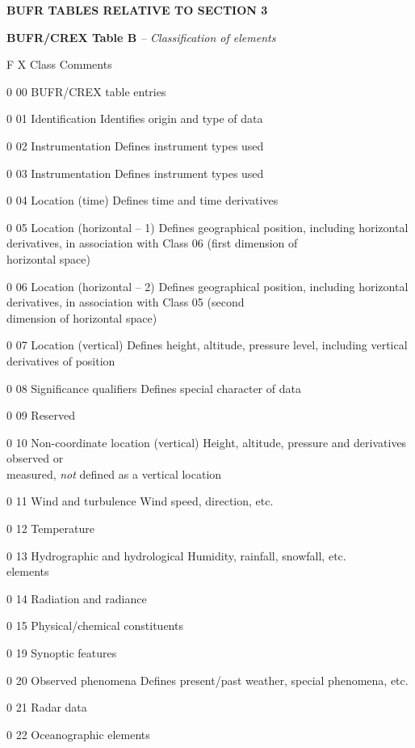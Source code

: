 \textbf{BUFR TABLES RELATIVE TO SECTION 3}

\textbf{BUFR/CREX Table B} \emph{-- Classification of elements}

F X Class Comments

0 00 BUFR/CREX table entries

0 01 Identification Identifies origin and type of data

0 02 Instrumentation Defines instrument types used

0 03 Instrumentation Defines instrument types used

0 04 Location (time) Defines time and time derivatives

0 05 Location (horizontal -- 1) Defines geographical position, including horizontal\\
derivatives, in association with Class 06 (first dimension of\\
horizontal space)

0 06 Location (horizontal -- 2) Defines geographical position, including horizontal\\
derivatives, in association with Class 05 (second\\
dimension of horizontal space)

0 07 Location (vertical) Defines height, altitude, pressure level, including vertical\\
derivatives of position

0 08 Significance qualifiers Defines special character of data

0 09 Reserved

0 10 Non-coordinate location (vertical) Height, altitude, pressure and derivatives observed or\\
measured, \emph{not} defined as a vertical location

0 11 Wind and turbulence Wind speed, direction, etc.

0 12 Temperature

0 13 Hydrographic and hydrological Humidity, rainfall, snowfall, etc.\\
elements

0 14 Radiation and radiance

0 15 Physical/chemical constituents

0 19 Synoptic features

0 20 Observed phenomena Defines present/past weather, special phenomena, etc.

0 21 Radar data

0 22 Oceanographic elements

